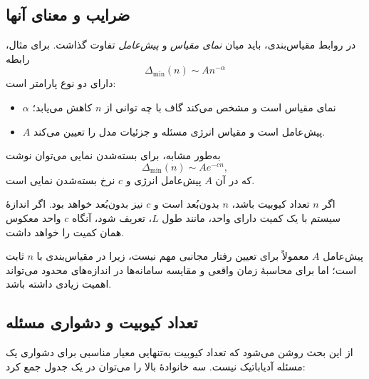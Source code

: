 \subsection{ضرایب و معنای آنها}

در روابط مقیاس‌بندی، باید میان \textit{نمای مقیاس} و
\textit{پیش‌عامل} تفاوت گذاشت. برای مثال، رابطه
\begin{equation}
	\Delta_{\min}(n)
	\sim
	A n^{-\alpha}
\end{equation}
دارای دو نوع پارامتر است:

\begin{itemize}
	\item $\alpha$ نمای مقیاس است و مشخص می‌کند گاف با چه توانی از
	$n$ کاهش می‌یابد؛
	
	\item $A$ پیش‌عامل است و مقیاس انرژی مسئله و جزئیات مدل را
	تعیین می‌کند.
	
\end{itemize}

به‌طور مشابه، برای بسته‌شدن نمایی می‌توان نوشت
\begin{equation}
	\Delta_{\min}(n)
	\sim
	A e^{-cn},
\end{equation}
که در آن $A$ پیش‌عامل انرژی و $c$ نرخ بسته‌شدن نمایی است.

اگر $n$ تعداد کیوبیت باشد، $n$ بدون‌بُعد است و $c$ نیز بدون‌بُعد خواهد بود. اگر اندازهٔ سیستم با یک کمیت دارای واحد، مانند طول $L$، تعریف شود، آنگاه $c$ واحد معکوس همان کمیت را خواهد داشت.

پیش‌عامل $A$ معمولاً برای تعیین رفتار مجانبی مهم نیست، زیرا در مقیاس‌بندی با $n$ ثابت است؛ اما برای محاسبهٔ زمان واقعی و مقایسه سامانه‌ها در اندازه‌های محدود می‌تواند اهمیت زیادی داشته باشد.

\subsection{تعداد کیوبیت و دشواری مسئله}

از این بحث روشن می‌شود که تعداد کیوبیت به‌تنهایی معیار مناسبی برای دشواری یک مسئله آدیاباتیک نیست. سه خانوادهٔ بالا را می‌توان در یک جدول جمع کرد:

